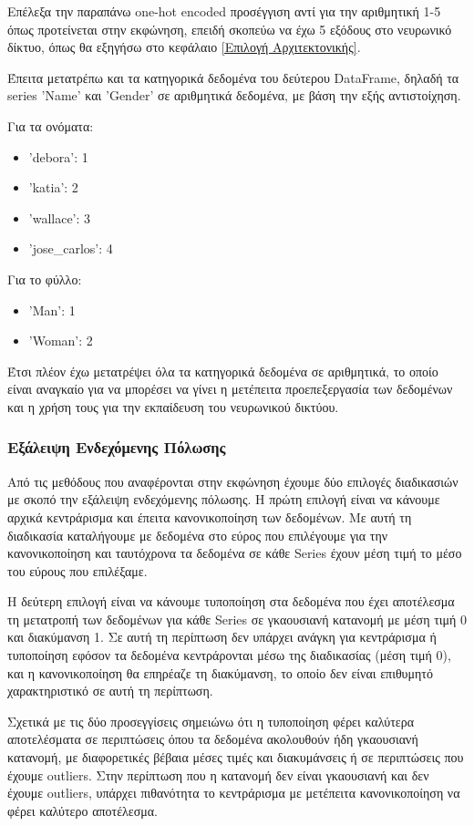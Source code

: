 \documentclass[12pt,a4paper]{article}
\begin{document}
Επέλεξα την παραπάνω one-hot encoded προσέγγιση αντί για την αριθμητική 1-5 όπως προτείνεται στην εκφώνηση, επειδή σκοπεύω να έχω 5 εξόδους στο νευρωνικό δίκτυο, όπως θα εξηγήσω στο κεφάλαιο \ref{Επιλογή Αρχιτεκτονικής}.

Έπειτα μετατρέπω και τα κατηγορικά δεδομένα του δεύτερου DataFrame, δηλαδή τα series 'Name' και 
'Gender' σε αριθμητικά δεδομένα, με βάση την εξής αντιστοίχηση.

Για τα ονόματα:
\begin{itemize}
    \item 'debora': 1
    \item 'katia': 2
    \item 'wallace': 3
    \item 'jose\_carlos': 4
\end{itemize}
Για το φύλλο:
\begin{itemize}
    \item 'Man': 1
    \item 'Woman': 2
\end{itemize}

Έτσι πλέον έχω μετατρέψει όλα τα κατηγορικά δεδομένα σε αριθμητικά, το οποίο είναι αναγκαίο για να μπορέσει να γίνει η μετέπειτα προεπεξεργασία των δεδομένων και η χρήση τους για την εκπαίδευση του νευρωνικού δικτύου.

\subsubsection{Εξάλειψη Ενδεχόμενης Πόλωσης}

Από τις μεθόδους που αναφέρονται στην εκφώνηση έχουμε δύο επιλογές διαδικασιών με σκοπό την εξάλειψη ενδεχόμενης πόλωσης. Η πρώτη επιλογή είναι να κάνουμε αρχικά κεντράρισμα και έπειτα κανονικοποίηση των δεδομένων. Με αυτή τη διαδικασία καταλήγουμε με δεδομένα στο εύρος που επιλέγουμε για την κανονικοποίηση και ταυτόχρονα τα δεδομένα σε κάθε Series έχουν μέση τιμή το μέσο του εύρους που επιλέξαμε. 

Η δεύτερη επιλογή είναι να κάνουμε τυποποίηση στα δεδομένα που έχει αποτέλεσμα τη μετατροπή των δεδομένων για κάθε Series σε γκαουσιανή κατανομή με μέση τιμή 0 και διακύμανση 1. Σε αυτή τη περίπτωση δεν υπάρχει ανάγκη για κεντράρισμα ή τυποποίηση εφόσον τα δεδομένα κεντράρονται μέσω της διαδικασίας (μέση τιμή 0), και η κανονικοποίηση θα επηρέαζε τη διακύμανση, το οποίο δεν είναι επιθυμητό χαρακτηριστικό σε αυτή τη περίπτωση. 

Σχετικά με τις δύο προσεγγίσεις σημειώνω ότι η τυποποίηση φέρει καλύτερα αποτελέσματα σε περιπτώσεις όπου τα δεδομένα ακολουθούν ήδη γκαουσιανή κατανομή, με διαφορετικές βέβαια μέσες τιμές και διακυμάνσεις ή σε περιπτώσεις που έχουμε outliers. Στην περίπτωση που η κατανομή δεν είναι γκαουσιανή και δεν έχουμε outliers, υπάρχει πιθανότητα το κεντράρισμα με μετέπειτα κανονικοποίηση να φέρει καλύτερο αποτέλεσμα.
\end{document}
